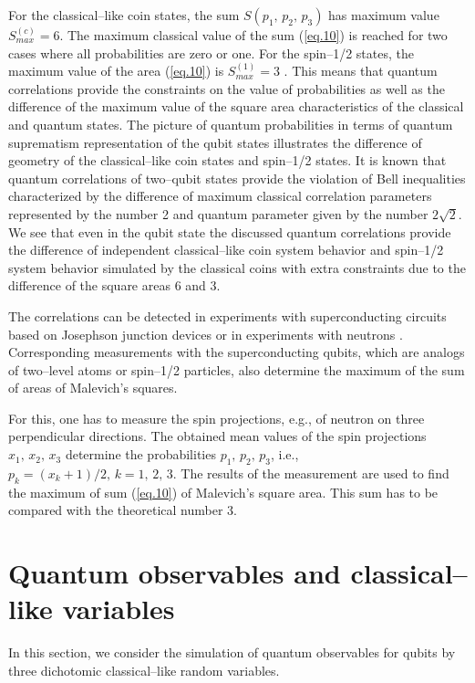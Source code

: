 \documentclass[12pt]{article}
\begin{document}
For the classical--like coin states, the sum $S(p_1,\,p_2,\,p_3)$ has maximum value $S_{max}^{(c)}=6$. The maximum classical value of the sum (\ref{eq.10}) is reached for two cases where all probabilities are zero or one. For the spin--1/2 states, the maximum value of the area (\ref{eq.10}) is $S_{max}^{(1)}=3$ \cite{Entr2018}. This means that quantum correlations provide the constraints on the value of probabilities as well as the difference of the maximum value of the square area characteristics of the classical and quantum states. The picture of quantum probabilities in terms of quantum suprematism representation of the qubit states illustrates the difference of geometry of the classical--like coin states and spin--1/2 states. It is known that quantum correlations of two--qubit states provide the violation of Bell inequalities \cite{Bell64} characterized by the difference of maximum classical correlation parameters represented by the number 2 and quantum parameter given by the number $2\sqrt2$. We see that even in the qubit state the discussed quantum correlations provide the difference of independent classical--like coin system behavior and spin--1/2 system behavior simulated by the classical coins with extra constraints due to the difference of the square areas 6 and 3. 

The correlations can be detected in experiments with superconducting circuits based on Josephson junction devices \cite{ShuelKoin,Astafiev,Walraff} or in experiments with neutrons \cite{Venalabor}.  Corresponding measurements with the superconducting qubits, which are analogs of two--level atoms or spin--1/2 particles, also determine the maximum of the sum of areas of Malevich's squares. 

For this, one has to measure the spin projections, e.g., of neutron on three perpendicular directions. The obtained mean values of the spin projections $x_1,\,x_2,\,x_3$ determine the probabilities $p_1,\,p_2,\,p_3$, i.e., $p_k=(x_k+1)/2,\,k=1,\,2,\,3.$ The results of the measurement are used to find the maximum of sum (\ref{eq.10}) of Malevich's square area. This sum has to be compared with the theoretical number  3. 

\section{Quantum observables and classical--like variables}
In this section, we consider the simulation of quantum observables  for qubits by three dichotomic classical--like random variables. 
\end{document}
